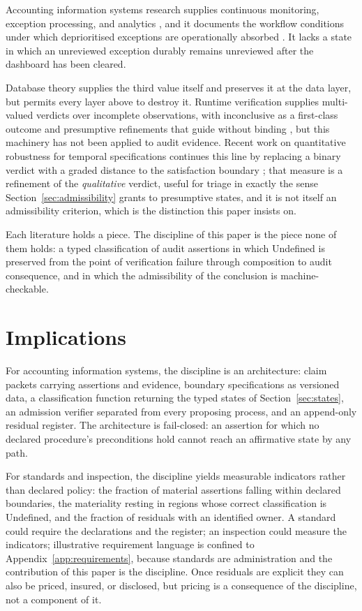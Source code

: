 \documentclass[smallcondensed,envcountsect,natbib]{svjour3}
\newcommand{\state}[1]{\textsf{#1}}
\begin{document}
Accounting information systems research supplies continuous monitoring, exception processing, and analytics \citep{vasarhelyi1991, kogan1999, alles2006, austin2021}, and it documents the workflow conditions under which deprioritised exceptions are operationally absorbed \citep{issa2016}. It lacks a state in which an unreviewed exception durably remains unreviewed after the dashboard has been cleared.

Database theory supplies the third value itself \citep{codd1979} and preserves it at the data layer, but permits every layer above to destroy it. Runtime verification supplies multi-valued verdicts over incomplete observations, with inconclusive as a first-class outcome and presumptive refinements that guide without binding \citep{bauer2011, bauer2010, leucker2009}, but this machinery has not been applied to audit evidence. Recent work on quantitative robustness for temporal specifications continues this line by replacing a binary verdict with a graded distance to the satisfaction boundary \citep{rino2026}; that measure is a refinement of the \emph{qualitative} verdict, useful for triage in exactly the sense Section~\ref{sec:admissibility} grants to presumptive states, and it is not itself an admissibility criterion, which is the distinction this paper insists on.

Each literature holds a piece. The discipline of this paper is the piece none of them holds: a typed classification of audit assertions in which \state{Undefined} is preserved from the point of verification failure through composition to audit consequence, and in which the admissibility of the conclusion is machine-checkable.

\section{Implications}
\label{sec:implications}

For accounting information systems, the discipline is an architecture: claim packets carrying assertions and evidence, boundary specifications as versioned data, a classification function returning the typed states of Section~\ref{sec:states}, an admission verifier separated from every proposing process, and an append-only residual register. The architecture is fail-closed: an assertion for which no declared procedure's preconditions hold cannot reach an affirmative state by any path.

For standards and inspection, the discipline yields measurable indicators rather than declared policy: the fraction of material assertions falling within declared boundaries, the materiality resting in regions whose correct classification is \state{Undefined}, and the fraction of residuals with an identified owner. A standard could require the declarations and the register; an inspection could measure the indicators; illustrative requirement language is confined to Appendix~\ref{app:requirements}, because standards are administration and the contribution of this paper is the discipline. Once residuals are explicit they can also be priced, insured, or disclosed, but pricing is a consequence of the discipline, not a component of it.
\end{document}
